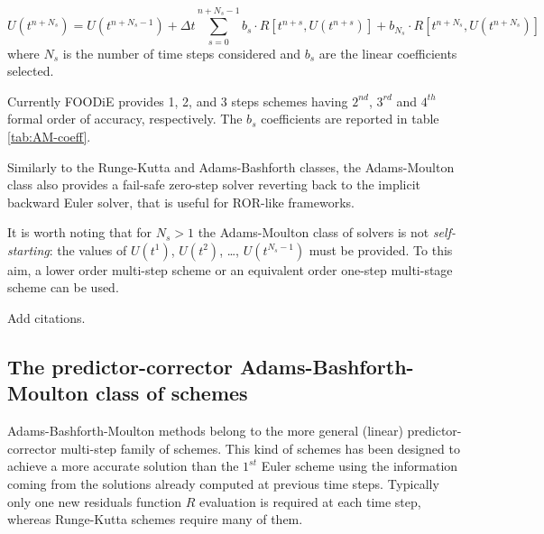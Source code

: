 \documentclass[pdftex,preprint,3p,times,numbers]{elsarticle}
\begin{document}
\begin{equation}
  U\left(t^{n+N_s}\right) = U\left(t^{n+N_s-1}\right) +\Delta t \sum_{s=0}^{n+N_s-1}{ b_s \cdot R\left[t^{n+s}, U\left(t^{n+s}\right)\right]} + b_{N_s}\cdot R\left[t^{n+N_s}, U\left(t^{n+N_s}\right)\right]
\label{eq:AM}
\end{equation}
where $N_s$ is the number of time steps considered and $b_s$ are the linear coefficients selected.

Currently FOODiE provides 1, 2, and 3 steps schemes having $2^{nd}$, $3^{rd}$ and $4^{th}$ formal order of accuracy, respectively. The $b_s$ coefficients are reported in table \ref{tab:AM-coeff}.

\begin{table}[!ht]
  \centering
  \caption{Implicit Adams-Moulton coefficients\label{tab:AM-coeff}}
\end{table}

Similarly to the Runge-Kutta and Adams-Bashforth classes, the Adams-Moulton class also provides a fail-safe zero-step solver reverting back to the implicit backward Euler solver, that is useful for ROR-like frameworks.

It is worth noting that for $N_s>1$ the Adams-Moulton class of solvers is not \emph{self-starting}: the values of $U\left(t^{1}\right)$, $U\left(t^{2}\right)$, \dots, $U\left(t^{N_s-1}\right)$ must be provided. To this aim, a lower order multi-step scheme or an equivalent order one-step multi-stage scheme can be used.

{\color{red} Add citations.}

\subsection{The predictor-corrector Adams-Bashforth-Moulton class of schemes}

Adams-Bashforth-Moulton methods belong to the more general (linear) predictor-corrector multi-step family of schemes. This kind of schemes has been designed to achieve a more accurate solution than the $1^{st}$ Euler scheme using the information coming from the solutions already computed at previous time steps. Typically only one new residuals function $R$ evaluation is required at each time step, whereas Runge-Kutta schemes require many of them.
\end{document}
